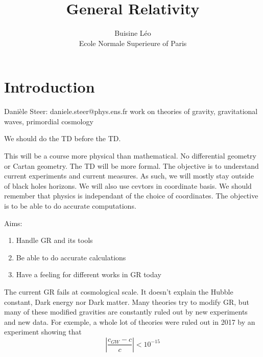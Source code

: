 \documentclass[a4paper]{book}
\theoremstyle{definition}
\theoremstyle{remark}
\begin{document}
\title{General Relativity}
\author{Buisine Léo\\Ecole Normale Superieure of Paris}
\maketitle

\tableofcontents

\chapter{Introduction}
Danièle Steer: daniele.steer@phys.ens.fr \newline
work on theories of gravity, gravitational waves, primordial cosmology \par \medskip 

We should do the TD before the TD. \par \medskip 

This will be a course more physical than mathematical. No differential geometry or Cartan geometry. The TD will be more formal. The objective is to understand current experiments and current measures. As such, we will mostly stay outside of black holes horizons. We will also use cevtors in coordinate basis. We should remember that physics is independant of the choice of coordinates. The objective is to be able to do accurate computations.\par \bigskip 

Aims:
\begin{enumerate}
    \item Handle GR and its tools
    \item Be able to do accurate calculations 
    \item Have a feeling for different works in GR today
\end{enumerate} \bigskip 

The current GR fails at cosmological scale. It doesn't explain the Hubble constant, Dark energy nor Dark matter. Many theories try to modify GR, but many of these modified gravities are constantly ruled out by new experiments and new data. For exemple, a whole lot of theories were ruled out in 2017 by an experiment showing that 
\begin{equation}
    \left|\frac{c_{GW}-c}{c}\right| < 10^{-15}
\end{equation}\par \medskip 
\end{document}
